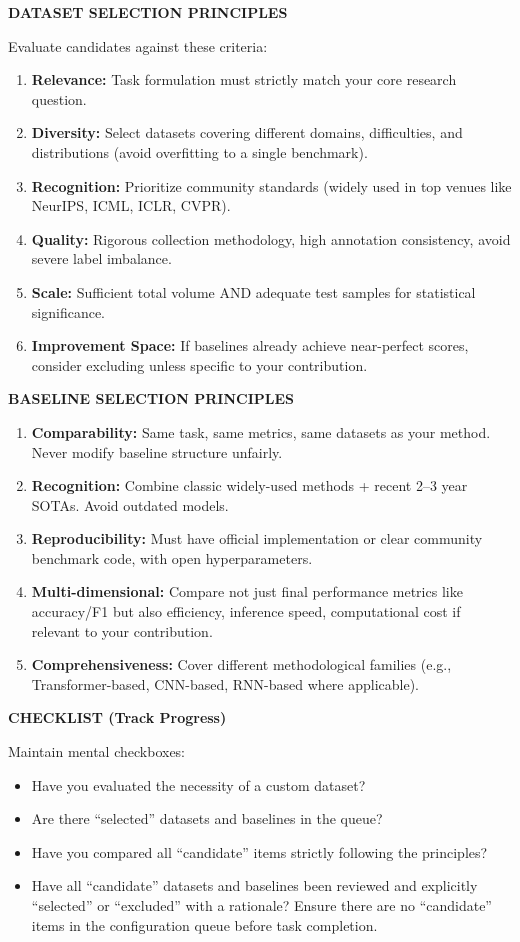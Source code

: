 \begin{tcolorbox}
\medskip
\textbf{DATASET SELECTION PRINCIPLES}

Evaluate candidates against these criteria:
\begin{enumerate}[nosep,leftmargin=12pt]
	\item \textbf{Relevance:} Task formulation must strictly match your core research question.
	\item \textbf{Diversity:} Select datasets covering different domains, difficulties, and distributions (avoid overfitting to a single benchmark).
	\item \textbf{Recognition:} Prioritize community standards (widely used in top venues like NeurIPS, ICML, ICLR, CVPR).
	\item \textbf{Quality:} Rigorous collection methodology, high annotation consistency, avoid severe label imbalance.
	\item \textbf{Scale:} Sufficient total volume AND adequate test samples for statistical significance.
	\item \textbf{Improvement Space:} If baselines already achieve near-perfect scores, consider excluding unless specific to your contribution.
\end{enumerate}

\medskip
\textbf{BASELINE SELECTION PRINCIPLES}
\begin{enumerate}[nosep,leftmargin=12pt]
	\item \textbf{Comparability:} Same task, same metrics, same datasets as your method. Never modify baseline structure unfairly.
	\item \textbf{Recognition:} Combine classic widely-used methods + recent 2--3 year SOTAs. Avoid outdated models.
	\item \textbf{Reproducibility:} Must have official implementation or clear community benchmark code, with open hyperparameters.
	\item \textbf{Multi-dimensional:} Compare not just final performance metrics like accuracy/F1 but also efficiency, inference speed, computational cost if relevant to your contribution.
	\item \textbf{Comprehensiveness:} Cover different methodological families (e.g., Transformer-based, CNN-based, RNN-based where applicable).
\end{enumerate}

\medskip
\textbf{CHECKLIST (Track Progress)}

Maintain mental checkboxes:
\begin{itemize}[nosep,leftmargin=12pt]
	\item [ ] Have you evaluated the necessity of a custom dataset?
	\item [ ] Are there ``selected'' datasets and baselines in the queue?
	\item [ ] Have you compared all ``candidate'' items strictly following the principles?
	\item [ ] Have all ``candidate'' datasets and baselines been reviewed and explicitly ``selected'' or ``excluded'' with a rationale? Ensure there are no ``candidate'' items in the configuration queue before task completion.
\end{itemize}


\end{tcolorbox}
